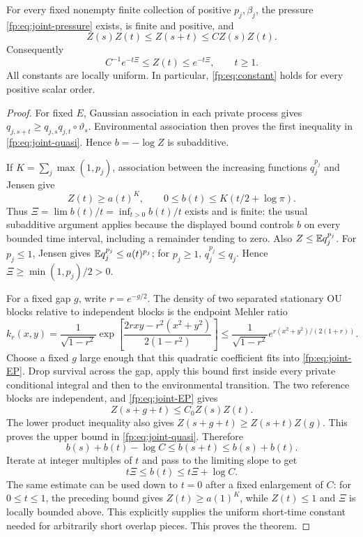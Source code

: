 \begin{theorem}\label{fp:thm:joint-constant}
For every fixed nonempty finite collection of positive $p_j,\beta_j$, the pressure \eqref{fp:eq:joint-pressure} exists, is finite and positive, and
\begin{equation}\label{fp:eq:joint-quasi}
 Z(s)Z(t)\le Z(s+t)\le C Z(s)Z(t).
\end{equation}
Consequently
\begin{equation}\label{fp:eq:joint-constant}
 C^{-1}e^{-t\Xi}\le Z(t)\le e^{-t\Xi},\qquad t\ge1.
\end{equation}
All constants are locally uniform. In particular, \eqref{fp:eq:constant} holds for every positive scalar order.
\end{theorem}
\begin{proof}
For fixed $E$, Gaussian association in each private process gives $q_{j,s+t}\ge q_{j,s}q_{j,t}\circ\vartheta_s$. Environmental association then proves the first inequality in \eqref{fp:eq:joint-quasi}. Hence $b=-\log Z$ is subadditive.

If $K=\sum_j\max(1,p_j)$, association between the increasing functions $q_j^{p_j}$ and Jensen give
\[
 Z(t)\ge a(t)^K,\qquad 0\le b(t)\le K(t/2+\log\pi).
\]
Thus $\Xi=\lim b(t)/t=\inf_{t>0}b(t)/t$ exists and is finite: the usual subadditive argument applies because the displayed bound controls $b$ on every bounded time interval, including a remainder tending to zero. Also $Z\le\mathbb E q_j^{p_j}$. For $p_j\le1$, Jensen gives $\mathbb E q_j^{p_j}\le a(t)^{p_j}$; for $p_j\ge1$, $q_j^{p_j}\le q_j$. Hence $\Xi\ge\min(1,p_j)/2>0$.

For a fixed gap $g$, write $r=e^{-g/2}$. The density of two separated stationary OU blocks relative to independent blocks is the endpoint Mehler ratio
\[
 k_r(x,y)=\frac1{\sqrt{1-r^2}}
 \exp\left[\frac{2rxy-r^2(x^2+y^2)}{2(1-r^2)}\right]
 \le\frac1{\sqrt{1-r^2}}
 e^{r(x^2+y^2)/(2(1+r))}.
\]
Choose a fixed $g$ large enough that this quadratic coefficient fits into \eqref{fp:eq:joint-EP}. Drop survival across the gap, apply this bound first inside every private conditional integral and then to the environmental transition. The two reference blocks are independent, and \eqref{fp:eq:joint-EP} gives
\[
 Z(s+g+t)\le C_0Z(s)Z(t).
\]
The lower product inequality also gives $Z(s+g+t)\ge Z(s+t)Z(g)$. This proves the upper bound in \eqref{fp:eq:joint-quasi}. Therefore
\[
 b(s)+b(t)-\log C\le b(s+t)\le b(s)+b(t).
\]
Iterate at integer multiples of $t$ and pass to the limiting slope to get
\[
 t\Xi\le b(t)\le t\Xi+\log C.
\]
The same estimate can be used down to $t=0$ after a fixed enlargement of $C$: for $0\le t\le1$, the preceding bound gives $Z(t)\ge a(1)^K$, while $Z(t)\le1$ and $\Xi$ is locally bounded above. This explicitly supplies the uniform short-time constant needed for arbitrarily short overlap pieces. This proves the theorem.
\end{proof}

